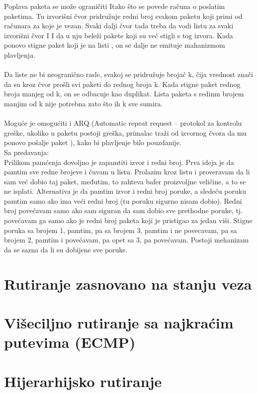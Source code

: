 \documentclass{article} %
\begin{document}
Poplava paketa se može ograničiti Itako što se povede računa o poslatim paketima. Tu izvorišni čvor pridružuje redni broj svakom paketu koji primi od računara za koje je vezan. Svaki dalji čvor tada treba da vodi listu za svaki izvorišni čvor I I da u nju beleži pakete koji su već stigli s tog izvora. Kada ponovo stigne paket koji je na listi , on se dalje ne emituje mahanizmom plavljenja.\\
\\
Da liste ne bi neogranično rasle, svakoj se pridružuje brojač k, čija vrednost znači da su kroz čvor prošli svi paketi do  rednog broja k. Kada stigne paket rednog broja manjeg od k, on se odbacuje kao duplikat. Lista paketa s redinm brojem manjim od k nije potrebna zato što ih k sve sumira.\\
\\
Moguće je omogućiti i ARQ (Automatic repeat request – protokol za kontrolu greške, ukoliko u paketu postoji greška, primalac traži od izvornog čvora da mu ponovo pošalje paket ), kako bi plavljenje bilo pouzdanije. \\


Sa predavanja:
\\
Prilikom pamćenja dovoljno je zapamtiti izvor i redni broj. Prva ideja je da pamtim sve redne brojeve i čuvam u listu. Prolazim kroz listu i proveravam da li sam već dobio taj paket, međutim, to zahteva bafer proizvoljne veličine, a to se ne isplati. Alternativa je da pamtim izvor i redni broj poruke, a sledeću poruku pamtim samo ako ima veći redni broj (tu poruku sigurno nisam dobio). Redni broj povećavam samo ako sam siguran da sam dobio sve prethodne poruke, tj. povećavam ga samo ako je redni broj paketa koji je pristigao za jedan viši. Stigne poruka sa brojem 1, pamtim, pa sa brojem 3, pamtim i ne povecavam, pa sa brojem 2, pamtim i povećavam, pa opet sa 3, pa povećavam. Postoji mehanizam da se sazna da li su dobijene sve poruke. 

\section{Rutiranje zasnovano na stanju veza}
\section{Višeciljno rutiranje sa najkraćim putevima (ECMP)}
\section{Hijerarhijsko rutiranje}
\end{document}
